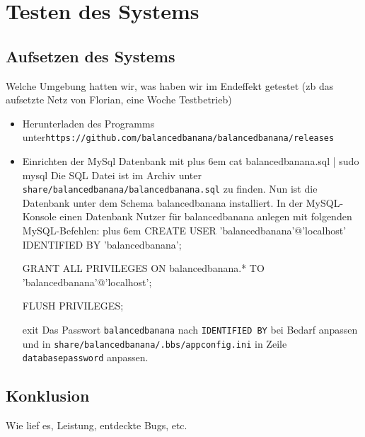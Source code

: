 \documentclass[a4paper,12pt]{article}
\makeatletter
\newenvironment{mycode}
 {\def\@xobeysp{\ }\verbatim\rightskip=0pt plus 6em\relax}
 {\endverbatim}
\makeatother
\begin{document}
\section{Testen des Systems}
\subsection{Aufsetzen des Systems}
\vspace{0.2cm}
Welche Umgebung hatten wir, was haben wir im Endeffekt getestet (zb das aufsetzte Netz von Florian, eine Woche Testbetrieb)
\begin{itemize}[label={\textbullet}]
    \item Herunterladen des Programms unter\newline \texttt{https://github.com/balancedbanana/balancedbanana/releases}
    \item Einrichten der MySql Datenbank mit \newline
    \begin{mycode}
    cat balancedbanana.sql | sudo mysql
    \end{mycode}
    Die SQL Datei ist im Archiv unter \newline \texttt{share/balancedbanana/balancedbanana.sql} \newline
    zu finden.\newline
    Nun ist die Datenbank unter dem Schema balancedbanana installiert.
    In der MySQL-Konsole einen Datenbank Nutzer für balancedbanana anlegen mit folgenden MySQL-Befehlen:
    \begin{mycode}
    CREATE USER 'balancedbanana'@'localhost' IDENTIFIED BY 
    'balancedbanana';
    	
    GRANT ALL PRIVILEGES ON balancedbanana.* TO 'balancedbanana'@'localhost';
        
    FLUSH PRIVILEGES;
        
    exit
    \end{mycode}
    Das Passwort \texttt{balancedbanana} nach \texttt{IDENTIFIED BY} bei Bedarf anpassen und in \newline
    \texttt{share/balancedbanana/.bbs/appconfig.ini} \newline
    in Zeile \texttt{databasepassword} anpassen. \newline

\end{itemize}
\subsection{Konklusion}
Wie lief es, Leistung, entdeckte Bugs, etc.
\clearpage
\end{document}
